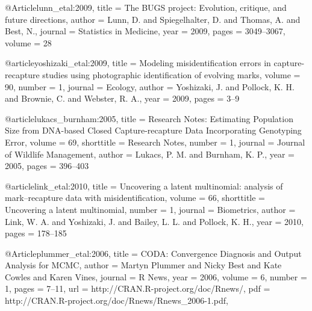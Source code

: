   @Article{lunn_etal:2009,
    title = {The BUGS project: Evolution, critique, and future directions},
    author = {Lunn, D. and  Spiegelhalter, D. and Thomas, A. and Best, N.},
    journal = {Statistics in Medicine},
    year = {2009},
    pages = {3049--3067},
    volume = {28}
  }
  
  @article{yoshizaki_etal:2009,
	title = {Modeling misidentification errors in capture-recapture studies using photographic identification of evolving marks},
	volume = {90},
	number = {1},
	journal = {Ecology},
	author = {Yoshizaki, J. and Pollock, K. H. and Brownie, C. and Webster, R. A.},
	year = {2009},
	pages = {3--9}
}


@article{lukacs_burnham:2005,
	title = {Research Notes: Estimating Population Size from {DNA-based} Closed Capture-recapture Data Incorporating Genotyping Error},
	volume = {69},
	shorttitle = {Research Notes},
	number = {1},
	journal = {Journal of Wildlife Management},
	author = {Lukacs, P. M. and Burnham, K. P.},
	year = {2005},
	pages = {396--403}
}

@article{link_etal:2010,
	title = {Uncovering a latent multinomial: analysis of mark–recapture data with misidentification},
	volume = {66},
	shorttitle = {Uncovering a latent multinomial},
	number = {1},
	journal = {Biometrics},
	author = {Link, W. A. and Yoshizaki, J. and Bailey, L. L. and Pollock, K. H.},
	year = {2010},
	pages = {178--185}
}

@Article{plummer_etal:2006,
    title = {CODA: Convergence Diagnosis and Output Analysis for MCMC},
    author = {Martyn Plummer and Nicky Best and Kate Cowles and Karen Vines},
    journal = {R News},
    year = {2006},
    volume = {6},
    number = {1},
    pages = {7--11},
    url = {http://CRAN.R-project.org/doc/Rnews/},
    pdf = {http://CRAN.R-project.org/doc/Rnews/Rnews_2006-1.pdf},
  }
